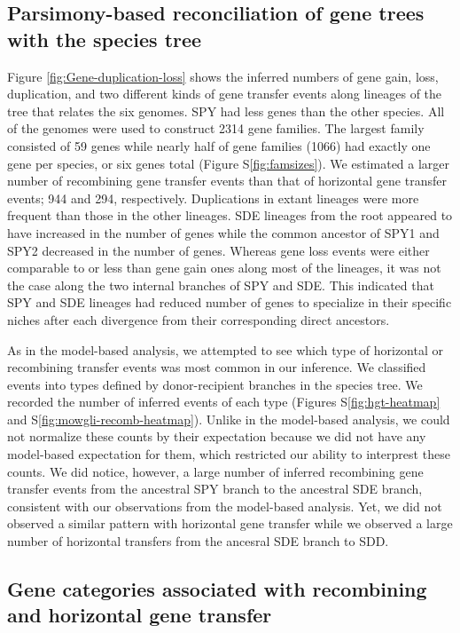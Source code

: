\documentclass[10pt]{article}
\begin{document}
\subsection*{Parsimony-based reconciliation of gene trees with the species tree}

Figure \ref{fig:Gene-duplication-loss} shows the inferred numbers of gene gain,
loss, duplication, and two different kinds of gene transfer events along
lineages of the tree that relates the six genomes. SPY had less genes than the
other species. All of the genomes were used to construct 2314 gene families.
The largest family consisted of 59 genes while nearly half of gene families
(1066) had exactly one gene per species, or six genes total (Figure
S\ref{fig:famsizes}).  We estimated a larger number of recombining gene transfer
events than that of horizontal gene transfer events; 944 and 294, respectively.
Duplications in extant lineages were more frequent than those in the other
lineages.  SDE lineages from the root appeared to have increased in the number
of genes while the common ancestor of SPY1 and SPY2 decreased in the number of
genes.  Whereas gene loss events were either comparable to or less than gene
gain ones along most of the lineages, it was not the case along the two internal
branches of SPY and SDE.  This indicated that SPY and SDE lineages had reduced
number of genes to specialize in their specific niches after each divergence
from their corresponding direct ancestors.

As in the model-based analysis, we attempted to see which type of horizontal or
recombining transfer events was most common in our inference.  We classified
events into types defined by donor-recipient branches in the species tree. We
recorded the number of inferred events of each type (Figures
S\ref{fig:hgt-heatmap} and S\ref{fig:mowgli-recomb-heatmap}). Unlike in the
model-based analysis, we could not normalize these counts by their expectation
because we did not have any model-based expectation for them, which restricted
our ability to interprest these counts. We did notice, however, a large number
of inferred recombining gene transfer events from the ancestral SPY branch to
the ancestral SDE branch, consistent with our observations from the model-based
analysis. Yet, we did not observed a similar pattern with horizontal gene
transfer while we observed a large number of horizontal transfers from the
ancesral SDE branch to SDD. 

\subsection*{Gene categories associated with recombining and horizontal gene transfer}
\end{document}
